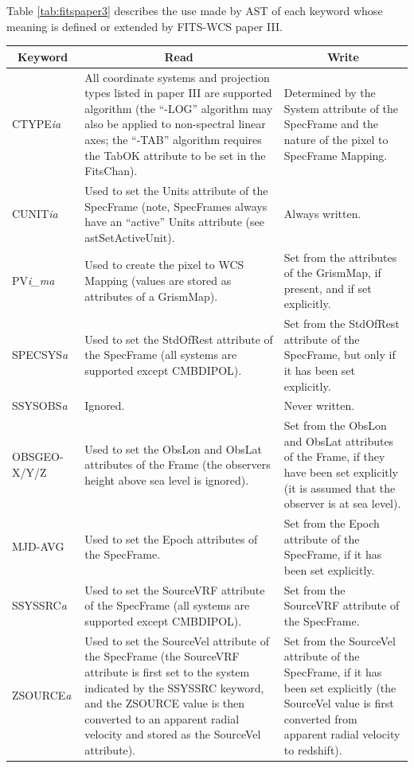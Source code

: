 \documentclass[twoside,11pt]{starlink}
\providecommand{\fitskey}[3]{{#1}&{#2}&{#3}\\}
\begin{document}
Table \ref{tab:fitspaper3} describes the use made by AST of each keyword
whose meaning is defined or extended by FITS-WCS paper III.

\begin{table}[htbp]
\begin{footnotesize}
\begin{tabular}{|l|p{2.5in}|p{2.5in}|}
\hline
\multicolumn{1}{|c|}{\textbf{Keyword}} & \multicolumn{1}{c|}{\textbf{Read}}
& \multicolumn{1}{c|}{\textbf{Write}} \\ \hline

\fitskey{CTYPE\emph{ia}}{All coordinate systems and projection types
listed in paper III are supported algorithm (the ``-LOG'' algorithm may
also be applied to non-spectral linear axes; the ``-TAB'' algorithm
requires the TabOK attribute to be set in the FitsChan).}{Determined by the System attribute of the
SpecFrame and the nature of the pixel to SpecFrame
Mapping.}

\fitskey{CUNIT\emph{ia}}{Used to set the Units attribute of
the SpecFrame (note, SpecFrames always have an ``active'' Units attribute
(see astSetActiveUnit).}{Always written.}

\fitskey{PV\emph{i\_ma}}{Used to create the pixel to WCS Mapping (values
are stored as attributes of a GrismMap).}
{Set from the attributes of the GrismMap, if present, and if set explicitly.}

\fitskey{SPECSYS\emph{a}}{Used to set the StdOfRest
attribute of the SpecFrame (all systems are supported except CMBDIPOL).}
{Set from the StdOfRest attribute of the SpecFrame, but only if it has been
set explicitly.}

\fitskey{SSYSOBS\emph{a}}{Ignored.}{Never written.}

\fitskey{OBSGEO-X/Y/Z}{Used to set the ObsLon and
ObsLat attributes of the Frame (the observers
height above sea level is ignored).}{Set from the ObsLon and ObsLat
attributes of the Frame, if they have been set explicitly (it is
assumed that the observer is at sea level).}

\fitskey{MJD-AVG}{Used to set the Epoch attributes of
the SpecFrame.}{Set from the Epoch attribute of the SpecFrame, if it has
been set explicitly.}

\fitskey{SSYSSRC\emph{a}}{Used to set the SourceVRF attribute of the
SpecFrame
(all systems are supported except CMBDIPOL).} {Set from the SourceVRF
attribute of the SpecFrame.}

\fitskey{ZSOURCE\emph{a}}{Used to set the SourceVel
attribute of the SpecFrame (the SourceVRF attribute
is first set to the system indicated by the SSYSSRC keyword, and the
ZSOURCE value is then converted to an apparent radial velocity and stored
as the SourceVel attribute).}
{Set from the SourceVel attribute of
the SpecFrame, if it has been set explicitly (the SourceVel value is
first converted from apparent radial velocity to redshift).}


\end{tabular}
\end{footnotesize}
\end{table}
\end{document}
